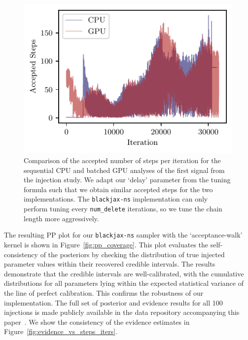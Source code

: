 \documentclass[fleqn,usenatbib]{mnras}
\begin{document}
\begin{figure}
    \centering
    \includegraphics{figures/chain_length_comparison.pdf}
    \caption{Comparison of the accepted number of steps per iteration for the sequential CPU and batched GPU analyses of
    the first signal from the injection study.
    We adapt our `delay' parameter from the tuning formula such that we obtain similar accepted steps for the 
    two implementations. The \texttt{blackjax-ns} implementation can only perform tuning every \mbox{\texttt{num\_delete}} iterations,
    so we tune the chain length more aggressively.}
    \label{fig:chain_length_comparison}
\end{figure}

The resulting PP plot for our \texttt{blackjax-ns} sampler
with the `acceptance-walk' kernel is shown in Figure~\ref{fig:pp_coverage}.
This plot evaluates the self-consistency of the posteriors by checking
the distribution of true injected parameter values within their
recovered credible intervals. The results demonstrate that the credible
intervals are well-calibrated, with the cumulative distributions for all
parameters lying within the expected statistical variance of the
line of perfect calibration. This confirms the robustness of our implementation. The full
set of posterior and evidence results for all 100 injections is made
publicly available in the data repository accompanying this paper~\citep{Prathaban_2025_zenodo}.
We show the consistency of the evidence estimates in Figure~\ref{fig:evidence_vs_steps_iters}.
\end{document}

